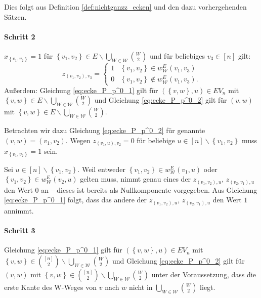 \documentclass[10p,a4paper,BCOR = 12mm, DIV=15]{scrbook}
\begin{document}
{\begin{bew}
Dies folgt aus Definition \ref{def:nichtganzz_ecken} und den dazu vorhergehenden Sätzen.

\paragraph{Schritt 2} $x_{\left\{v_1, v_2\right\}} = 1$ für $\left\{v_1, v_2\right\} \in E \backslash \bigcup_{W \in \mathcal{W}} {W \choose 2}$ und für beliebiges $v_3 \in \left[n\right]$ gilt:
\begin{displaymath}
z_{\left(v_1, v_2\right), v_3} = \begin{cases}
1 & \left\{v_1, v_2\right\} \in w_{\mathcal{W}}^E\left(v_1, v_3\right) \\
0 & \left\{v_1, v_2\right\} \notin w_{\mathcal{W}}^E\left(v_1, v_3\right).
\end{cases}
\end{displaymath}
Außerdem: Gleichung \eqref{eq:ecke_P_p^0_1} gilt für $\left(\left\{v, w\right\}, u\right)\in EV_n$ mit $\left\{v, w\right\} \in E \backslash \bigcup_{W \in \mathcal{W}} {W \choose 2}$ und Gleichung \eqref{eq:ecke_P_p^0_2} gilt für $\left(v, w\right)$ mit $\left\{v, w\right\} \in E \backslash \bigcup_{W \in \mathcal{W}} {W \choose 2}$.

Betrachten wir dazu Gleichung \eqref{eq:ecke_P_p^0_2} für genannte $\left(v, w\right) = \left(v_1, v_2\right)$. Wegen $z_{\left(v_1, u\right), v_2} = 0$ für beliebige $u \in \left[n\right] \backslash \left\{v_1, v_2\right\}$ muss $x_{\left\{v_1, v_2\right\}} = 1$ sein.

Sei $u \in \left[n\right] \backslash \left\{v_1, v_2\right\}$. Weil entweder $\left\{v_1, v_2\right\} \in w_{\mathcal{W}}^E\left(v_1, u\right)$ oder $\left\{v_1, v_2\right\} \in w_{\mathcal{W}}^E\left(v_2, u\right)$ gelten muss, nimmt genau eines der  $z_{\left(v_1, v_2\right), u}$, $z_{\left(v_2, v_1\right), u}$ den Wert 0 an -- dieses ist bereits als Nullkomponente vorgegeben. Aus Gleichung \eqref{eq:ecke_P_p^0_1} folgt, dass das andere der $z_{\left(v_1, v_2\right), u}$, $z_{\left(v_2, v_1\right), u}$ den Wert $1$ annimmt.

\paragraph{Schritt 3} Gleichung \eqref{eq:ecke_P_p^0_1} gilt für $\left(\left\{v, w\right\}, u\right)\in EV_n$ mit $\left\{v, w\right\} \in {\left[n\right] \choose 2} \backslash \bigcup_{W \in \mathcal{W}} {W \choose 2}$ und Gleichung \eqref{eq:ecke_P_p^0_2} gilt für $\left(v, w\right)$ mit $\left\{v, w\right\} \in {\left[n\right] \choose 2} \backslash \bigcup_{W \in \mathcal{W}} {W \choose 2}$ unter der Voraussetzung, dass die erste Kante des W-Weges von $v$ nach $w$ nicht in $\bigcup_{W \in \mathcal{W}} {W \choose 2}$ liegt.


\end{bew}}
\end{document}
